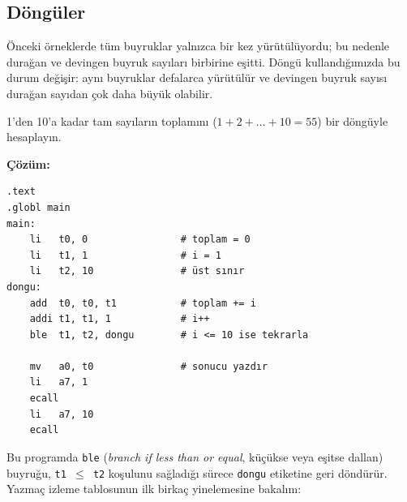 \subsection{Döngüler}
\label{subsec:donguler}

Önceki örneklerde tüm buyruklar yalnızca bir kez yürütülüyordu; bu nedenle durağan ve devingen buyruk sayıları birbirine eşitti. Döngü kullandığımızda bu durum değişir: aynı buyruklar defalarca yürütülür ve devingen buyruk sayısı durağan sayıdan çok daha büyük olabilir.

\begin{ornek}[4.5]
\label{orn:dongu-toplam}
1'den 10'a kadar tam sayıların toplamını ($1 + 2 + \ldots + 10 = 55$) bir döngüyle hesaplayın.

\textbf{Çözüm:}

\begin{lstlisting}[style=riscv]
.text
.globl main
main:
    li   t0, 0                # toplam = 0
    li   t1, 1                # i = 1
    li   t2, 10               # üst sınır
dongu:
    add  t0, t0, t1           # toplam += i
    addi t1, t1, 1            # i++
    ble  t1, t2, dongu        # i <= 10 ise tekrarla

    mv   a0, t0               # sonucu yazdır
    li   a7, 1
    ecall
    li   a7, 10
    ecall
\end{lstlisting}

Bu programda \texttt{ble} (\emph{branch if less than or equal}, küçükse veya eşitse dallan) buyruğu, \texttt{t1~$\leq$~t2} koşulunu sağladığı sürece \texttt{dongu} etiketine geri döndürür. Yazmaç izleme tablosunun ilk birkaç yinelemesine bakalım:


\end{ornek}
